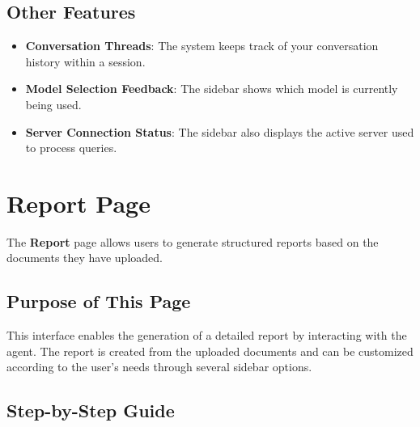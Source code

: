 \documentclass[11pt,a4paper]{report}
\begin{document}
\subsection*{Other Features}

\begin{itemize}
    \item \textbf{Conversation Threads}: The system keeps track of your conversation history within a session.
    \item \textbf{Model Selection Feedback}: The sidebar shows which model is currently being used.
    \item \textbf{Server Connection Status}: The sidebar also displays the active server used to process queries.
\end{itemize}


\section{Report Page}

The \textbf{Report} page allows users to generate structured reports based on the documents they have uploaded.

\subsection*{Purpose of This Page}

This interface enables the generation of a detailed report by interacting with the agent. The report is created from the uploaded documents and can be customized according to the user’s needs through several sidebar options.

\subsection*{Step-by-Step Guide}
\end{document}
